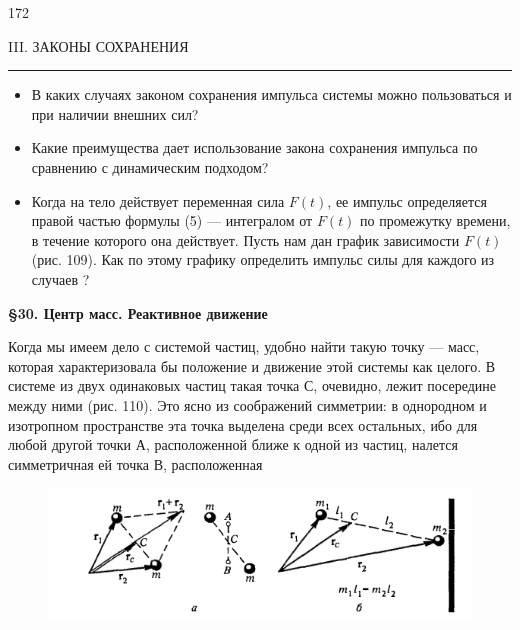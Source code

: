 \documentclass[11pt, a4paper]{article}
\begin{document}
	\Large
	
	\begin{adjustwidth}{1.5cm}{}
		172 
		\vspace*{-14pt}
		\begin{center}
			III. ЗАКОНЫ СОХРАНЕНИЯ
		\end{center}
		\vspace*{-7pt}
		
		\hspace*{-0.6cm}\rule{16.5cm}{0.5pt}
	
		\begin{itemize}
			\item В каких случаях законом сохранения импульса системы можно пользоваться и при наличии внешних сил?
			\item Какие преимущества дает использование закона сохранения импульса по сравнению с динамическим подходом?
			\item Когда на тело действует переменная сила $F(t)$, ее импульс определяется правой частью формулы (5) — интегралом от $F(t)$ по промежутку времени, в течение которого она действует. Пусть нам дан график зависимости $F(t)$ (рис. 109). Как по этому графику определить импульс силы для каждого из случаев   ?
		\end{itemize}
		
		\noindent\textbf{\S 30. Центр масс. Реактивное движение}
		\vspace{0.4cm}
		
		\noindent Когда мы имеем дело с системой частиц, удобно найти такую точку —  масс\rm, которая характеризовала бы положение и движение этой системы как целого. В системе из двух одинаковых частиц такая точка С, очевидно, лежит посередине между ними (рис. 110\rm). Это ясно из соображений симметрии: в однородном и изотропном пространстве эта точка выделена среди всех остальных, ибо для любой другой точки А, расположенной ближе к одной из частиц, налется симметричная ей точка В, расположенная		
	
		\begin{figure}[h]
			\hspace{1.5cm}\includegraphics[scale=0.8]{graphic}
			\begin{adjustwidth}{1.5cm}{}
			\end{adjustwidth}
		\end{figure}
		

\end{adjustwidth}
\end{document}
